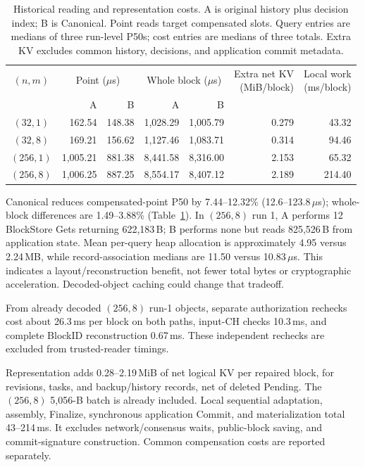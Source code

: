 \begin{table}[t]
  \caption{Historical reading and representation costs. A is original
    history plus decision index; B is Canonical. Point reads target
    compensated slots. Query entries are medians of three run-level
    P50s; cost entries are medians of three totals. Extra KV excludes
    common history, decisions, and application commit metadata.}
  \label{tab:eval-reader}
  \centering
  \small
  \setlength{\tabcolsep}{8pt}
  \begin{tabular}{@{}crrrrrr@{}}
    \toprule
    $(n,m)$ &
    \multicolumn{2}{c}{Point ($\mu$s)} &
    \multicolumn{2}{c}{Whole block ($\mu$s)} &
    \shortstack{Extra net KV\\(MiB/block)} &
    \shortstack{Local work\\(ms/block)} \\
    \cmidrule(lr){2-3}\cmidrule(lr){4-5}
    & A & B & A & B & & \\
    \midrule
    $(32,1)$  & 162.54  & 148.38 & 1,028.29 & 1,005.79 & 0.279 & 43.32 \\
    $(32,8)$  & 169.21  & 156.62 & 1,127.46 & 1,083.71 & 0.314 & 94.46 \\
    $(256,1)$ & 1,005.21 & 881.38 & 8,441.58 & 8,316.00 & 2.153 & 65.32 \\
    $(256,8)$ & 1,006.25 & 887.25 & 8,554.17 & 8,407.12 & 2.189 & 214.40 \\
    \bottomrule
  \end{tabular}
\end{table}

Canonical reduces compensated-point P50 by 7.44--12.32\%
(12.6--123.8\,$\mu$s); whole-block differences are 1.49--3.88\%
(Table~\ref{tab:eval-reader}). In $(256,8)$ run 1, A performs 12
BlockStore Gets returning 622,183\,B; B performs none but reads
825,526\,B from application state. Mean per-query heap allocation is approximately
4.95 versus 2.24\,MB, while record-association medians are
11.50 versus 10.83\,$\mu$s. This indicates a layout/reconstruction
benefit, not fewer total bytes or cryptographic acceleration.
Decoded-object caching could change that tradeoff.

From already decoded $(256,8)$ run-1 objects, separate authorization
rechecks cost about 26.3\,ms per block on both paths, input-CH
checks 10.3\,ms, and complete BlockID reconstruction 0.67\,ms.
These independent rechecks are excluded from trusted-reader timings.

Representation adds 0.28--2.19\,MiB of net logical KV per repaired
block, for revisions, tasks, and backup/history records, net of deleted Pending. The $(256,8)$ 5,056-B batch is already
included. Local sequential adaptation, assembly, Finalize, synchronous
application Commit, and materialization total 43--214\,ms.
It excludes network/consensus waits, public-block saving, and
commit-signature construction. Common compensation costs are reported separately.

